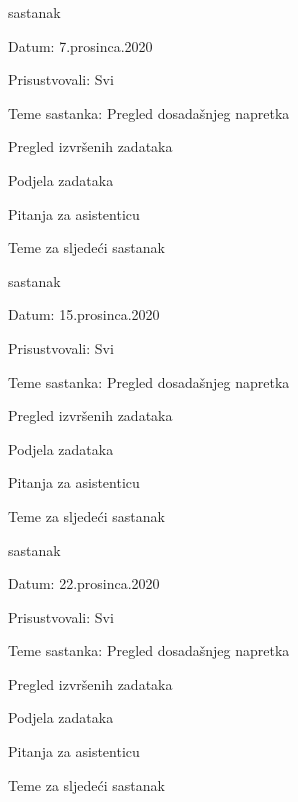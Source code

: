 \begin{packed_enum}
				\item  sastanak
			\item[] \begin{packed_item}
				\item Datum: 7.prosinca.2020
				\item Prisustvovali: Svi
				\item Teme sastanka: Pregled dosadašnjeg napretka
				\begin{packed_item}
				    \item Pregled izvršenih zadataka
					\item Podjela zadataka
					\item Pitanja za asistenticu
					\item Teme za sljedeći sastanak
				\end{packed_item}
			\end{packed_item}
			
				\item  sastanak
			\item[] \begin{packed_item}
				\item Datum: 15.prosinca.2020
				\item Prisustvovali: Svi
				\item Teme sastanka: Pregled dosadašnjeg napretka
				\begin{packed_item}
				    \item Pregled izvršenih zadataka
					\item Podjela zadataka
					\item Pitanja za asistenticu
					\item Teme za sljedeći sastanak
				\end{packed_item}
			\end{packed_item}
			
				\item  sastanak
			\item[] \begin{packed_item}
				\item Datum: 22.prosinca.2020
				\item Prisustvovali: Svi
				\item Teme sastanka: Pregled dosadašnjeg napretka
				\begin{packed_item}
				    \item Pregled izvršenih zadataka
					\item Podjela zadataka
					\item Pitanja za asistenticu
					\item Teme za sljedeći sastanak
				\end{packed_item}
			\end{packed_item}
			

\end{packed_enum}
